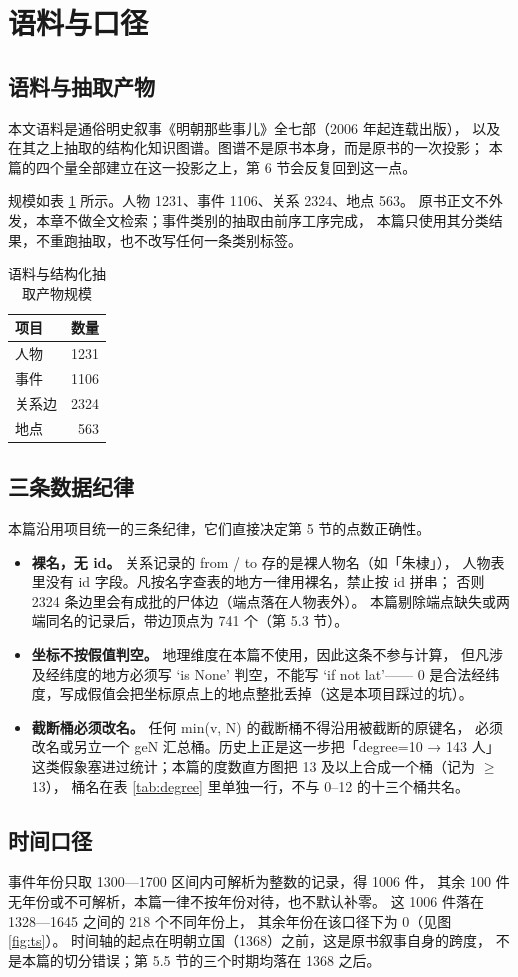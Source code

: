 \section{语料与口径}

\subsection{语料与抽取产物}

本文语料是通俗明史叙事《明朝那些事儿》全七部（2006 年起连载出版），
以及在其之上抽取的结构化知识图谱。图谱不是原书本身，而是原书的一次投影；
本篇的四个量全部建立在这一投影之上，第 6 节会反复回到这一点。

规模如表 \ref{tab:corpus} 所示。人物 1231、事件 1106、关系 2324、地点 563。
原书正文不外发，本章不做全文检索；事件类别的抽取由前序工序完成，
本篇只使用其分类结果，不重跑抽取，也不改写任何一条类别标签。

\begin{table}[!t]
\centering
\caption{语料与结构化抽取产物规模}
\label{tab:corpus}
\small
\begin{tabular}{lr}
\toprule
项目 & 数量 \\
\midrule
人物 & 1231 \\
事件 & 1106 \\
关系边 & 2324 \\
地点 & 563 \\
\bottomrule
\end{tabular}
\end{table}

\subsection{三条数据纪律}

本篇沿用项目统一的三条纪律，它们直接决定第 5 节的点数正确性。

\begin{itemize}
\item \textbf{裸名，无 id。} 关系记录的 from / to 存的是裸人物名（如「朱棣」），
人物表里没有 id 字段。凡按名字查表的地方一律用裸名，禁止按 id 拼串；
否则 2324 条边里会有成批的尸体边（端点落在人物表外）。
本篇剔除端点缺失或两端同名的记录后，带边顶点为 741 个（第 5.3 节）。
\item \textbf{坐标不按假值判空。} 地理维度在本篇不使用，因此这条不参与计算，
但凡涉及经纬度的地方必须写 `is None' 判空，不能写 `if not lat'——
0 是合法经纬度，写成假值会把坐标原点上的地点整批丢掉（这是本项目踩过的坑）。
\item \textbf{截断桶必须改名。} 任何 min(v, N) 的截断桶不得沿用被截断的原键名，
必须改名或另立一个 geN 汇总桶。历史上正是这一步把「degree=10 → 143 人」
这类假象塞进过统计；本篇的度数直方图把 13 及以上合成一个桶（记为 $\geq$13），
桶名在表 \ref{tab:degree} 里单独一行，不与 0--12 的十三个桶共名。
\end{itemize}

\subsection{时间口径}

事件年份只取 1300—1700 区间内可解析为整数的记录，得 1006 件，
其余 100 件无年份或不可解析，本篇一律不按年份对待，也不默认补零。
这 1006 件落在 1328—1645 之间的 218 个不同年份上，
其余年份在该口径下为 0（见图 \ref{fig:ts}）。
时间轴的起点在明朝立国（1368）之前，这是原书叙事自身的跨度，
不是本篇的切分错误；第 5.5 节的三个时期均落在 1368 之后。
